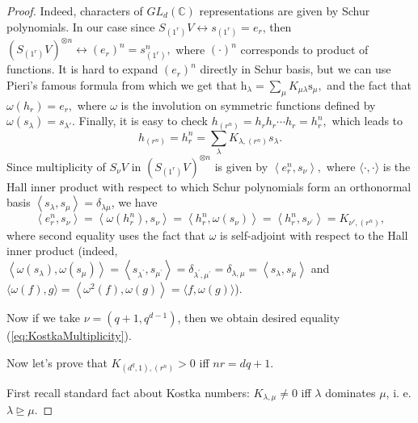 \documentclass[11pt,letterpaper]{article}
\theoremstyle{plain}
\theoremstyle{plain}
\theoremstyle{plain}
\theoremstyle{plain}
\theoremstyle{plain}
\theoremstyle{plain}
\theoremstyle{plain}
\theoremstyle{definition}
\theoremstyle{plain}
\begin{document}
\begin{proof}
    Indeed, characters of $GL_d(\mathbb{C})$ representations are given by Schur polynomials. 
    In our case since $S_{\left(1^r\right)}V \leftrightarrow s_{\left(1^r\right)}=e_r$, then
    $
        \left(S_{\left(1^r\right)}V\right)^{\otimes n} \leftrightarrow\left(e_r\right)^n=s_{\left(1^r\right)}^n,
    $
    where $(\cdot)^n$ corresponds to product of functions. It is hard to expand $\left(e_r\right)^n$
    directly in Schur basis, but we can use Pieri's famous formula from which we get that
    $
        \mathrm{h}_\lambda=\sum_\mu K_{\mu \lambda} \mathrm{s}_\mu,
    $
    and the fact that 
    $
        \omega\left(h_r\right)=e_r,
    $
    where $\omega$ is the involution on symmetric functions defined by $\omega\left(s_\lambda\right)=s_{\lambda'}$. Finally, it is easy to check
    $
        h_{\left(r^n\right)}=h_r h_r \cdots h_r=h_r^n,
    $
    which leads to
    \[
        h_{\left(r^n\right)}=h_r^n=\sum_\lambda K_{\lambda,\left(r^n\right)} s_\lambda.
    \]
    Since multiplicity of $S_\nu V$ in $\left(S_{\left(1^r\right)}V\right)^{\otimes n}$ is given by
    $
        \left\langle e_r^n, s_\nu\right\rangle,
    $
    where $\langle\cdot, \cdot\rangle$ is the Hall inner product with respect to which Schur polynomials form an orthonormal basis $\left\langle s_\lambda, s_\mu\right\rangle=\delta_{\lambda \mu}$, we have
    \[
        \left\langle e_r^n, s_\nu\right\rangle=\left\langle\omega\left(h_r^n\right), s_\nu\right\rangle=\left\langle h_r^n, \omega\left(s_\nu\right)\right\rangle=\left\langle h_r^n, s_{\nu^{\prime}}\right\rangle=K_{\nu', (r^n)},
    \]
    where second equality uses the fact that $\omega$ is self-adjoint with respect to the Hall inner product (indeed, 
    $\left\langle\omega\left(s_\lambda\right), \omega\left(s_\mu\right)\right\rangle=\left\langle s_{\lambda^{\prime}}, s_{\mu^{\prime}}\right\rangle=\delta_{\lambda^{\prime}, \mu^{\prime}}=\delta_{\lambda, \mu}=\left\langle s_\lambda, s_\mu\right\rangle$
    and $\langle\omega(f), g\rangle=\left\langle\omega^2(f), \omega(g)\right\rangle=\langle f, \omega(g)\rangle$).
    
    Now if we take $\nu=\left(q+1, q^{d-1}\right)$, then we obtain desired equality (\ref{eq:KostkaMultiplicity}).
    
    Now let's prove that $K_{\left(d^q, 1\right),\left(r^n\right)} > 0$ iff $n r=d q+1$.
    
    First recall standard fact about Kostka numbers: $K_{\lambda, \mu} \neq 0$ iff $\lambda$ dominates $\mu$, i. e. $\lambda \trianglerighteq \mu$.  
    

\end{proof}
\end{document}
